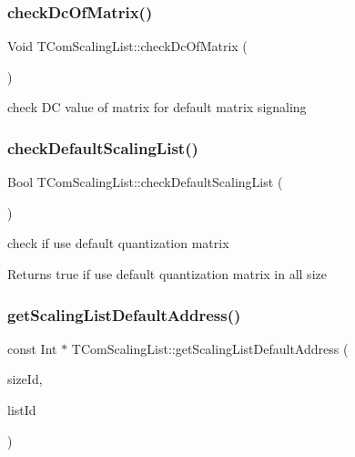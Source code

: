 \subsubsection{\texorpdfstring{check\+Dc\+Of\+Matrix()}{checkDcOfMatrix()}}
{\footnotesize\ttfamily Void T\+Com\+Scaling\+List\+::check\+Dc\+Of\+Matrix (\begin{DoxyParamCaption}{ }\end{DoxyParamCaption})}

check DC value of matrix for default matrix signaling \mbox{\label{class_t_com_scaling_list_ace5822827a13edfd286189816315adcd}} 
\subsubsection{\texorpdfstring{check\+Default\+Scaling\+List()}{checkDefaultScalingList()}}
{\footnotesize\ttfamily Bool T\+Com\+Scaling\+List\+::check\+Default\+Scaling\+List (\begin{DoxyParamCaption}{ }\end{DoxyParamCaption})}

check if use default quantization matrix \begin{DoxyReturn}{Returns}
true if use default quantization matrix in all size 
\end{DoxyReturn}
\mbox{\label{class_t_com_scaling_list_a350f921a49148b73860de67d57ddd51b}} 
\subsubsection{\texorpdfstring{get\+Scaling\+List\+Default\+Address()}{getScalingListDefaultAddress()}}
{\footnotesize\ttfamily const Int $\ast$ T\+Com\+Scaling\+List\+::get\+Scaling\+List\+Default\+Address (\begin{DoxyParamCaption}\item[{U\+Int}]{size\+Id,  }\item[{U\+Int}]{list\+Id }\end{DoxyParamCaption})}



